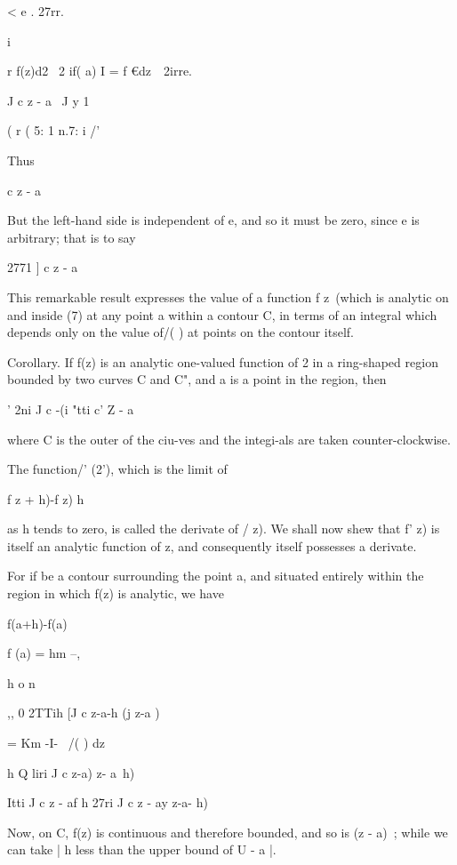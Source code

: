 {{< e . 27rr.

i

%
%

r f(z)d2 \ 2 if( a) I = f €dz\ \ 2irre.

J c z - a \ J y 1

( r ( 5: 1 n.7: i /'

Thus

c z - a

But the left-hand side is independent of e, and so it must be zero,
since e is arbitrary; that is to say

    2771 ] c z - a

This remarkable result expresses the value of a function f z\ (which
is analytic on and inside (7) at any point a within a contour C, in
terms of an integral which depends only on the value of/( ) at points
on the contour itself.

Corollary. If f(z) is an analytic one-valued function of 2 in a
ring-shaped region bounded by two curves C and C", and a is a point in
the region, then

' 2ni J c -(i "tti c' Z - a

where C is the outer of the ciu-ves and the integi-als are taken
counter-clockwise.


The function/' (2'), which is the limit of

f z + h)-f z) h

as h tends to zero, is called the derivate of / z). We shall now shew
that f' z) is itself an analytic function of z, and consequently
itself possesses a derivate.

For if be a contour surrounding the point a, and situated entirely
within the region in which f(z) is analytic, we have

f(a+h)-f(a)

f (a) = hm --,

h o n

,, 0 2TTih [J c z-a-h (j z-a )

= Km -I- \ /( ) dz

h Q liri J c z-a) z- a~h)

Itti J c z - af h 27ri J c z - ay z-a- h)

Now, on C, f(z) is continuous and therefore bounded, and so is (z -
a)~; while we can take | h less than the upper bound of U - a |.

\

%
%

}}
